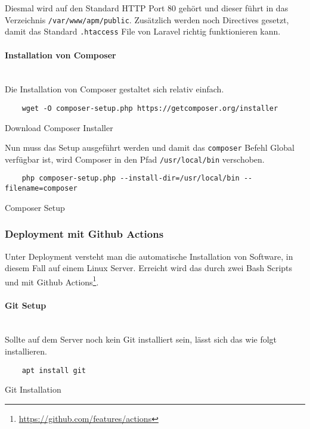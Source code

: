 Diesmal wird auf den Standard HTTP Port 80 gehört und dieser führt in das
Verzeichnis
\verb|/var/www/apm/public|. Zusätzlich werden noch Directives
gesetzt, damit das Standard \verb|.htaccess| File von Laravel richtig
funktionieren kann.
\\
\paragraph{Installation von Composer}\mbox{}\\

Die Installation von Composer gestaltet sich relativ einfach.

\begin{listing}[H]
  \begin{verbatim}
    wget -O composer-setup.php https://getcomposer.org/installer
  \end{verbatim}
  \caption{Download Composer Installer}
\end{listing}

Nun muss das Setup ausgeführt werden und damit das \verb|composer| Befehl Global
verfügbar ist, wird Composer in den Pfad \verb|/usr/local/bin| verschoben.

\begin{listing}[H]
  \begin{verbatim}
    php composer-setup.php --install-dir=/usr/local/bin --filename=composer
  \end{verbatim}
  \caption{Composer Setup}
\end{listing}

\subsubsection{Deployment mit Github Actions}
Unter Deployment versteht man die automatische Installation von Software, in
diesem Fall auf einem Linux Server. Erreicht wird das durch zwei Bash Scripts
und mit Github Actions\footnote{\url{https://github.com/features/actions}}.

\paragraph{Git Setup}\mbox{}\\

Sollte auf dem Server noch kein Git installiert sein, lässt sich das wie folgt
installieren.

\begin{listing}[H]
  \begin{verbatim}
    apt install git
  \end{verbatim}
  \caption{Git Installation}
\end{listing}

